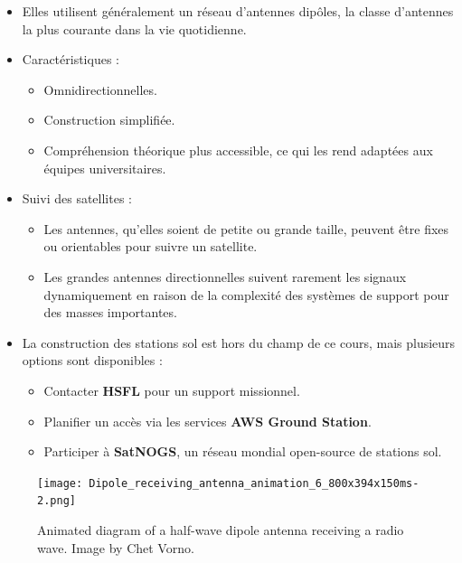 \begin{itemize}
    \item Elles utilisent g\'en\'eralement un r\'eseau d'antennes dip\^oles, la classe d'antennes la plus courante dans la vie quotidienne.
    \item Caract\'eristiques :
    \begin{itemize}
        \item Omnidirectionnelles.  
        \item Construction simplifi\'ee.  
        \item Compr\'ehension th\'eorique plus accessible, ce qui les rend adapt\'ees aux \'equipes universitaires.  
    \end{itemize}
    \item Suivi des satellites :
    \begin{itemize}
        \item Les antennes, qu'elles soient de petite ou grande taille, peuvent \^etre fixes ou orientables pour suivre un satellite.
        \item Les grandes antennes directionnelles suivent rarement les signaux dynamiquement en raison de la complexit\'e des syst\`emes de support pour des masses importantes.
    \end{itemize}
    \item La construction des stations sol est hors du champ de ce cours, mais plusieurs options sont disponibles :
    \begin{itemize}
        \item Contacter \textbf{HSFL} pour un support missionnel.
        \item Planifier un acc\`es via les services \textbf{AWS Ground Station}.
        \item Participer \`a \textbf{SatNOGS}, un r\'eseau mondial open-source de stations sol.  
    \end{itemize}
\end{itemize}
\begin{figure}[H] %
    \centering
    \texttt{[image: Dipole\_receiving\_antenna\_animation\_6\_800x394x150ms-2.png]}
    \caption{Animated diagram of a half-wave dipole antenna receiving a radio wave. Image by Chet Vorno.}
    \label{fig:communication2}
\end{figure}

